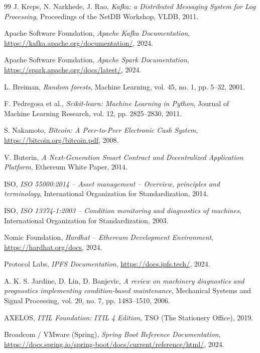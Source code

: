 \documentclass[12pt, a4paper, oneside]{report}
\begin{document}
\begin{thebibliography}{99}
  J. Kreps, N. Narkhede, J. Rao,
  \textit{Kafka: a Distributed Messaging System for Log Processing},
  Proceedings of the NetDB Workshop, VLDB, 2011.

  Apache Software Foundation,
  \textit{Apache Kafka Documentation},
  \url{https://kafka.apache.org/documentation/}, 2024.

  Apache Software Foundation,
  \textit{Apache Spark Documentation},
  \url{https://spark.apache.org/docs/latest/}, 2024.

  L. Breiman,
  \textit{Random forests},
  Machine Learning, vol. 45, no. 1, pp. 5--32, 2001.

  F. Pedregosa et al.,
  \textit{Scikit-learn: Machine Learning in Python},
  Journal of Machine Learning Research, vol. 12, pp. 2825--2830, 2011.

  S. Nakamoto,
  \textit{Bitcoin: A Peer-to-Peer Electronic Cash System},
  \url{https://bitcoin.org/bitcoin.pdf}, 2008.

  V. Buterin,
  \textit{A Next-Generation Smart Contract and Decentralized Application Platform},
  Ethereum White Paper, 2014.

  ISO,
  \textit{ISO 55000:2014 -- Asset management -- Overview, principles and terminology},
  International Organization for Standardization, 2014.

  ISO,
  \textit{ISO 13374-1:2003 -- Condition monitoring and diagnostics of machines},
  International Organization for Standardization, 2003.

  Nomic Foundation,
  \textit{Hardhat -- Ethereum Development Environment},
  \url{https://hardhat.org/docs}, 2024.

  Protocol Labs,
  \textit{IPFS Documentation},
  \url{https://docs.ipfs.tech/}, 2024.

  A. K. S. Jardine, D. Lin, D. Banjevic,
  \textit{A review on machinery diagnostics and prognostics implementing condition-based maintenance},
  Mechanical Systems and Signal Processing, vol. 20, no. 7, pp. 1483--1510, 2006.

  AXELOS,
  \textit{ITIL Foundation: ITIL 4 Edition},
  TSO (The Stationery Office), 2019.

  Broadcom / VMware (Spring),
  \textit{Spring Boot Reference Documentation},
  \url{https://docs.spring.io/spring-boot/docs/current/reference/html/}, 2024.


\end{thebibliography}
\end{document}
